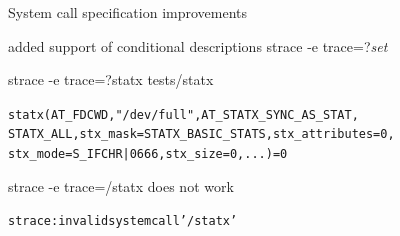 \documentclass[unicode,aspectratio=169]{beamer}
\begin{document}
\begin{frame}[fragile]{System call specification improvements}
\begin{block}{\large added support of conditional descriptions}
strace -e trace=?\textit{set}
\end{block}
\begin{block}{\large strace -e trace=?statx tests/statx}
\begin{alltt}
statx(AT_FDCWD, "/dev/full", AT_STATX_SYNC_AS_STAT,
STATX_ALL, {stx_mask=STATX_BASIC_STATS, stx_attributes=0,
stx_mode=S_IFCHR|0666, stx_size=0, ...}) = 0
\end{alltt}
\end{block}
\begin{block}{\large strace -e trace=/statx does not work}
\begin{alltt}
strace: invalid system call '/statx'
\end{alltt}
\end{block}
\end{frame}
\end{document}
